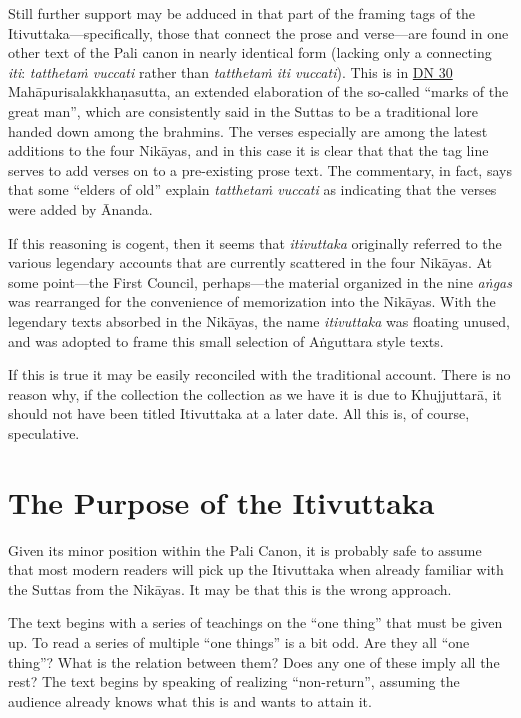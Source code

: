\documentclass[12pt,openany]{book}%
\begin{document}
Still further support may be adduced in that part of the framing tags of the Itivuttaka—specifically, those that connect the prose and verse—are found in one other text of the Pali canon in nearly identical form (lacking only a connecting \emph{iti}: \emph{\textsanskrit{tatthetaṁ} vuccati} rather than \emph{\textsanskrit{tatthetaṁ} iti vuccati}). This is in \href{https://suttacentral.net/dn30/en/sujato}{DN 30} \textsanskrit{Mahāpurisalakkhaṇasutta}, an extended elaboration of the so-called “marks of the great man”, which are consistently said in the Suttas to be a traditional lore handed down among the brahmins. The verses especially are among the latest additions to the four \textsanskrit{Nikāyas}, and in this case it is clear that that the tag line serves to add verses on to a pre-existing prose text. The commentary, in fact, says that some “elders of old” explain \emph{\textsanskrit{tatthetaṁ} vuccati} as indicating that the verses were added by Ānanda.

If this reasoning is cogent, then it seems that \emph{itivuttaka} originally referred to the various legendary accounts that are currently scattered in the four \textsanskrit{Nikāyas}. At some point—the First Council, perhaps—the material organized in the nine  \emph{\textsanskrit{aṅgas}} was rearranged for the convenience of memorization into the \textsanskrit{Nikāyas}. With the legendary texts absorbed in the \textsanskrit{Nikāyas}, the name \emph{itivuttaka} was floating unused, and was adopted to frame this small selection of \textsanskrit{Aṅguttara} style texts.

If this is true it may be easily reconciled with the traditional account. There is no reason why, if the collection the collection as we have it is due to \textsanskrit{Khujjuttarā}, it should not have been titled Itivuttaka at a later date. All this is, of course, speculative.

\section*{The Purpose of the Itivuttaka}

Given its minor position within the Pali Canon, it is probably safe to assume that most modern readers will pick up the Itivuttaka when already familiar with the Suttas from the \textsanskrit{Nikāyas}. It may be that this is the wrong approach.

The text begins with a series of teachings on the “one thing” that must be given up. To read a series of multiple “one things” is a bit odd. Are they all “one thing”? What is the relation between them? Does any one of these imply all the rest? The text begins by speaking of realizing “non-return”, assuming the audience already knows what this is and wants to attain it.
\end{document}
